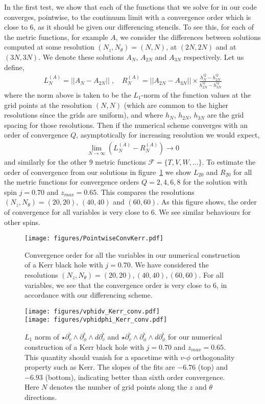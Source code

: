 \documentclass[12pt]{article}
\numberwithin{equation}{section}
\begin{document}
In the first test, we show that each of the functions that we solve for in our code converges, pointwise, to the continuum limit with a convergence order which is close to 6, as it should be given our differencing stencils. To see this, for each of the metric functions, for example $A$, we consider the differences between solutions computed at some resolution $(N_z, N_\theta) = (N,N)$, at $(2 N, 2N)$ and at $(3 N, 3N)$. 
We denote these solutions $A_N$, $A_{2 N}$ and $A_{3 N}$ respectively.  Let us define,
\begin{eqnarray}
L^{(A)}_N = ||A_{N}-A_{2 N}|| \; , \quad R^{(A)}_N = ||A_{2 N}-A_{3 N}|| \times \frac{h_{N}^Q-h_{2 N}^Q}{h_{2 N}^Q-h_{3 N}^Q}
\end{eqnarray}
where the norm above is taken to be the $L_1$-norm of the function values at the grid points at the resolution $(N,N)$ (which are common to the higher resolutions since the grids are uniform), and where $h_{N}$, $h_{2 N}$, $h_{3 N}$ are the grid spacing for those resolutions.
Then if the numerical scheme converges with an order of convergence $Q$, asymptotically for increasing resolution we would expect,
\begin{eqnarray}
\lim_{N\to\infty}\left( L^{(A)}_N - R^{(A)}_N \right) \to 0
\end{eqnarray}
and similarly for the other 9 metric functions $\mathcal{F} = \{ T, V, W, \ldots\}$. To estimate the order of convergence from our solutions in figure~\ref{fig:pointwise_kerr} we show $L_{20}$ and $R_{20}$ for all the metric functions for convergence orders $Q=2,4,6,8$ for the solution with spin $j = 0.70$ and $z_{max} = 0.65$. This compares the resolutions $(N_z, N_\theta) = (20,20)$, $(40,40)$ and $(60,60)$. 
As this figure shows, the order of convergence for all variables is very close to 6. We see similar behaviours for other spins. 
\begin{figure}[t]
\centering
\texttt{[image: figures/PointwiseConvKerr.pdf]}
\caption{Convergence order for all the variables in our numerical construction of a Kerr black hole with $j=0.70$. We have considered the resolutions $(N_z,N_\theta)=(20,20),(40,40),(60,60)$. For all variables, we see that the convergence order is very close to 6, in accordance with our differencing scheme.}
\label{fig:pointwise_kerr}
\end{figure}

\begin{figure}[t]
\centering
\texttt{[image: figures/vphidv\_Kerr\_conv.pdf]}\\
\centering
\texttt{[image: figures/vphidphi\_Kerr\_conv.pdf]}
\caption{$L_1$ norm of $\star \partial_v^\flat\wedge \partial_\phi^\flat\wedge d\partial_v^\flat$ and $\star \partial_v^\flat\wedge \partial_\phi^\flat\wedge d\partial_\phi^\flat$ for our numerical construction of a Kerr black hole with $j=0.70$ and $z_{max}=0.65$. This quantity should vanish for a spacetime with $v$-$\phi$ orthogonality property such as Kerr. The slopes of the fits are $-6.76$ (top) and $-6.93$ (bottom), indicating better than sixth order convergence. Here $N$ denotes the number of grid points along the $z$ and $\theta$ directions.}
\label{fig:vphidv_Kerr}
\end{figure}
\end{document}
